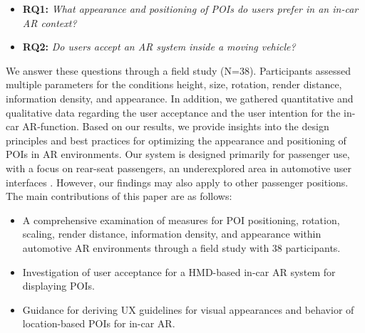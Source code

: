 \begin{itemize}
    \item \textbf{RQ1:} \textit{What appearance and positioning of POIs do users prefer in an in-car AR context?}
    \item \textbf{RQ2:} \textit{Do users accept an AR system inside a moving vehicle?}
\end{itemize}

We answer these questions through a field study (N=38). Participants assessed multiple parameters for the conditions height, size, rotation, render distance, information density, and appearance. In addition, we gathered quantitative and qualitative data regarding the user acceptance and the user intention for the in-car AR-function. Based on our results, we provide insights into the design principles and best practices for optimizing the appearance and positioning of POIs in AR environments. Our system is designed primarily for passenger use, with a focus on rear-seat passengers, an underexplored area in automotive user interfaces \cite{BergerRearSeatDoor21}. However, our findings may also apply to other passenger positions. The main contributions of this paper are as follows:
\begin{itemize}
    \item A comprehensive examination of measures for POI positioning, rotation, scaling, render distance, information density, and appearance within automotive AR environments through a field study with 38 participants.
    \item Investigation of user acceptance for a HMD-based in-car AR system for displaying POIs.
    \item Guidance for deriving UX guidelines for visual appearances and behavior of location-based POIs for in-car AR.
\end{itemize}